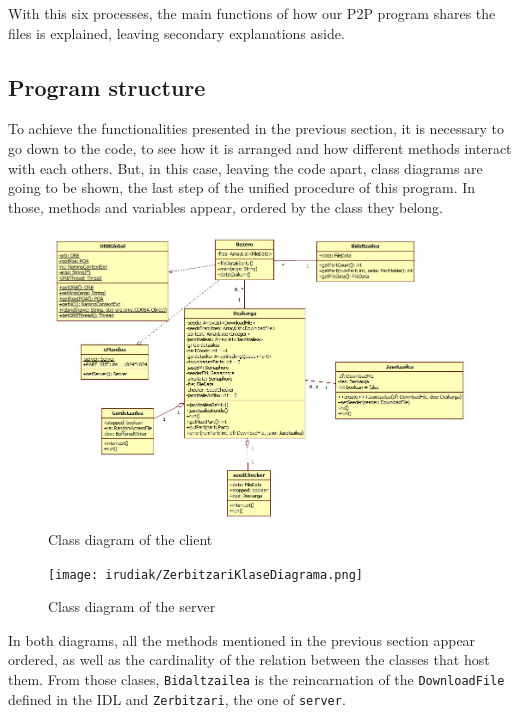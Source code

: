 With this six processes, the main functions of how our P2P program shares the files is explained, leaving secondary explanations aside.

\subsection{Program structure}
To achieve the functionalities presented in the previous section, it is necessary to go down to the code, to see how it is arranged and how different methods interact with each others. But, in this case, leaving the code apart, class diagrams are going to be shown, the last step of the unified procedure of this program. In those, methods and variables appear, ordered by the class they belong. 

\begin{figure}
   \centering
   \includegraphics[scale=0.5]{irudiak/BezeroKlaseDiagrama.png}
   \caption{Class diagram of the client}
   \label{fig:klasebezero}
\end{figure}  

\begin{figure}
   \centering
   \texttt{[image: irudiak/ZerbitzariKlaseDiagrama.png]}
   \caption{Class diagram of the server}
   \label{fig:klasezerbitzaria}
\end{figure}
 
In both diagrams, all the methods mentioned in the previous section appear ordered, as well as the cardinality of the relation between the classes that host them. From those clases, \texttt{Bidaltzailea} is the reincarnation of the \texttt{DownloadFile} defined in the IDL and \texttt{Zerbitzari}, the one of \texttt{server}. 